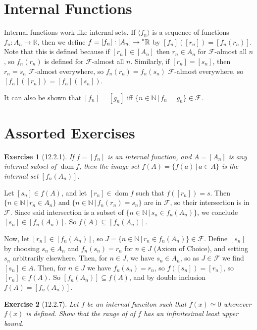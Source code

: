 \documentclass{article}
\newcommand{\sthat}{\,|\,}
\newcommand{\reals}{\mathbb{R}}
\newcommand{\hreals}{\prescript{*}{}{\mathbb{R}}}
\newcommand{\nats}{\mathbb{N}}
\DeclareMathOperator{\dom}{dom}
\newtheorem*{exercise}{Exercise}
\begin{document}
\section*{Internal Functions}
Internal functions work like internal sets. If $\langle f_n \rangle$ is a sequence of functions $f_n: A_n \to \reals$, then we define $f = [f_n]: [A_n] \to \hreals$ by $[f_n]([r_n]) = [f_n(r_n)]$. Note that this is defined because if $[r_n] \in [A_n]$ then $r_n \in A_n$ for $\mathcal{F}$-almost all $n$, so $f_n(r_n)$ is defined for $\mathcal{F}$-almost all $n$. Similarly, if $[r_n] = [s_n]$, then $r_n = s_n$ $\mathcal{F}$-almost everywhere, so $f_n(r_n) = f_n(s_n)$ $\mathcal{F}$-almost everywhere, so $[f_n]([r_n])=[f_n]([s_n])$.

It can also be shown that $[f_n] = [g_n]$ iff $\{n \in \nats \sthat f_n = g_n\} \in \mathcal{F}$.

\section*{Assorted Exercises}
\begin{exercise}[12.2.1]
    If $f = [f_n]$ is an internal function, and $A = [A_n]$ is any internal subset of $\dom f$, then the image set $f(A) = \{f(a) \sthat a \in A\}$ is the internal set $[f_n(A_n)]$.
\end{exercise}
Let $[s_n] \in f(A)$, and let $[r_n] \in \dom f$ such that $f([r_n]) = s$. Then $\{n \in \nats \sthat r_n \in A_n\}$ and $\{n \in \nats \sthat f_n(r_n) = s_n\}$ are in $\mathcal{F}$, so their intersection is in $\mathcal{F}$. Since said intersection is a subset of $\{n \in \nats \sthat s_n \in f_n(A_n)\}$, we conclude $[s_n] \in [f_n(A_n)]$. So $f(A) \subseteq [f_n(A_n)]$.

Now, let $[r_n] \in [f_n(A_n)]$, so $J = \{n \in \nats \sthat r_n \in f_n(A_n)\} \in \mathcal{F}$. Define $[s_n]$ by choosing $s_n \in A_n$ and $f_n(s_n) = r_n$ for $n \in J$ (Axiom of Choice), and setting $s_n$ arbitrarily elsewhere. Then, for $n \in J$, we have $s_n \in A_n$, so as $J \in \mathcal{F}$ we find $[s_n] \in A$. Then, for $n \in J$ we have $f_n(s_n) = r_n$, so $f([s_n]) = [r_n]$, so $[r_n] \in f(A)$. So $[f_n(A_n)] \subseteq f(A)$, and by double inclusion $f(A) = [f_n(A_n)]$.

\begin{exercise}[12.2.7]
    Let $f$ be an internal funciton such that $f(x) \simeq 0$ whenever $f(x)$ is defined. Show that the range of of $f$ has an infinitesimal least upper bound.
\end{exercise}
\end{document}
